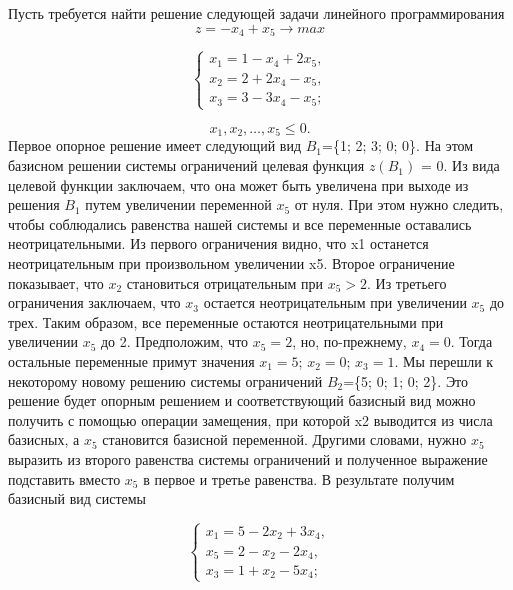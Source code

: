 Пусть требуется найти решение следующей задачи линейного программирования
$$z = -x_4 + x_5 \rightarrow max$$

\begin{equation*}
\begin{cases}
x_1 = 1 - x_4 +2x_5,\\
x_2 = 2 + 2x_4 - x_5,\\
x_3 = 3 - 3x_4 - x_5;
\end{cases}
\end{equation*}

$$x_1,x_2,\dots,x_5 \leq 0.$$
Первое опорное решение имеет следующий вид $B_1$=\{1; 2; 3; 0; 0\}. На этом базисном решении системы ограничений целевая функция $z(B_1)$ = 0. Из вида целевой функции заключаем, что она может быть увеличена при выходе из решения $B_1$   путем  увеличении переменной $x_5$ от нуля. При этом нужно следить, чтобы соблюдались равенства нашей системы и все переменные оставались неотрицательными. Из первого ограничения видно, что x1 останется неотрицательным при произвольном увеличении x5. Второе ограничение показывает, что $x_2$ становиться отрицательным при $x_5 > 2$. Из третьего ограничения заключаем, что $x_3$ остается неотрицательным при увеличении $x_5$ до трех. Таким образом, все переменные остаются неотрицательными при увеличении $x_5$ до 2. Предположим, что $x_5 =2$, но, по-прежнему, $x_4= 0$. Тогда остальные переменные примут значения $x_1= 5$; $x_2= 0$; $x_3 = 1$. Мы перешли к некоторому новому решению системы ограничений $B_2$=\{5; 0; 1; 0; 2\}. Это решение будет опорным решением и соответствующий базисный вид можно получить с помощью операции замещения, при которой x2 выводится из числа базисных, а $x_5$ становится базисной переменной. Другими словами, нужно $x_5$ выразить из второго равенства системы ограничений и полученное выражение подставить вместо $x_5$ в первое и третье равенства. В результате получим базисный вид системы

\begin{equation*}
\begin{cases}
x_1 = 5 - 2x_2 + 3x_4,\\
x_5 = 2 - x_2 - 2x_4,\\
x_3 = 1 + x_2 - 5x_4;
\end{cases}
\end{equation*}

